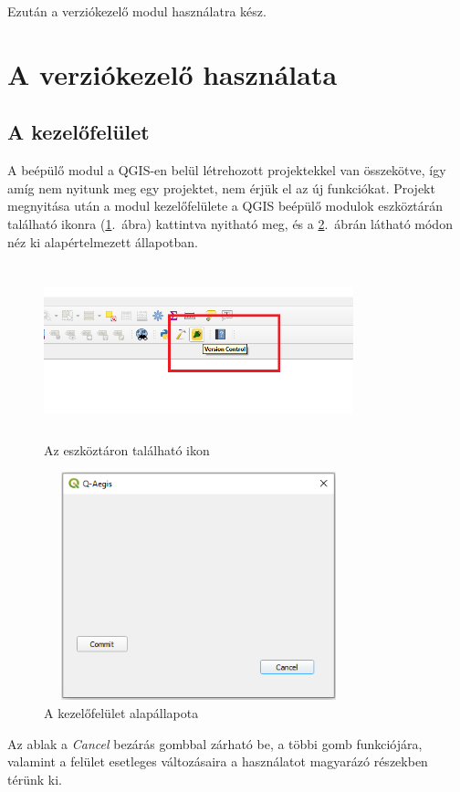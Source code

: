 Ezután a verziókezelő modul használatra kész.
	
\section{A verziókezelő használata}
\subsection{A kezelőfelület}
A beépülő modul a QGIS-en belül létrehozott projektekkel van összekötve, így amíg nem nyitunk meg egy projektet, nem érjük el az új funkciókat. Projekt megnyitása után  a modul kezelőfelülete a QGIS beépülő modulok eszköztárán található ikonra (\ref{fig:picture-2}.~ábra) kattintva nyitható meg, és a \ref{fig:picture-3}.~ábrán  látható módon néz ki alapértelmezett állapotban.
\begin{figure}[H]
	\centering
	\includegraphics[width=0.8\textwidth,height=190px]{images/plugin_button.png}
	\caption{Az eszköztáron található ikon}
	\label{fig:picture-2}
\end{figure}
\begin{figure}[H]
	\centering
	\includegraphics[width=0.8\textwidth,height=250px]{images/norepo_state.png}
	\caption{A kezelőfelület alapállapota}
	\label{fig:picture-3}
\end{figure}
Az ablak a \emph{Cancel} bezárás gombbal zárható be, a többi gomb funkciójára, valamint a felület esetleges változásaira a használatot magyarázó részekben térünk ki.
